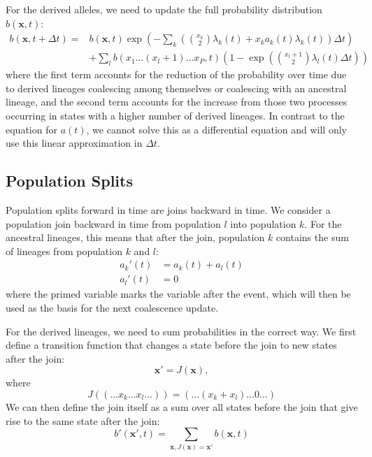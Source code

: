 \documentclass[a4paper]{article}
\begin{document}
For the derived alleles, we need to update the full probability distribution $b(\mathbf{x},t)$:
\begin{equation}
\begin{split}
     b(\mathbf{x}, t+\Delta t) = & b(\mathbf{x}, t) \exp\left( -\sum_k \left(\binom{x_k}{2}\lambda_k(t) +
                         x_k a_k(t) \lambda_k(t)   \right)\Delta t \right)\\
     & + \sum_l b(x_1\ldots (x_l+1)\ldots x_P, t) \left(1-\exp\left(
                     \binom{x_l + 1}{2}\lambda_l(t)\Delta t\right)  \right)
\end{split}
\end{equation}
where the first term accounts for the reduction of the probability over time due to derived lineages coalescing among themselves or coalescing with an ancestral lineage, and the second term accounts for the increase from those two processes occurring in states with a higher number of derived lineages. In contrast to the equation for $a(t)$, we cannot solve this as a differential equation and will only use this linear approximation in $\Delta t$.

\subsection*{Population Splits}
Population splits forward in time are joins backward in time. We consider a population join backward in time from population $l$ into population $k$. For the ancestral lineages, this means that after the join, population $k$ contains the sum of lineages from population $k$ and $l$:
\begin{align}
    a_k'(t) &= a_k(t) + a_l(t)\\
    a_l'(t) &= 0
\end{align}
where the primed variable marks the variable after the event, which will then be used as the basis for the next coalescence update.

For the derived lineages, we need to sum probabilities in the correct way. We first define a transition function that changes a state before the join to new states after the join:
\begin{equation}
    \mathbf{x}' = J(\mathbf{x}),
\end{equation} 
where
\begin{equation}
    J((\ldots x_k \ldots x_l \dots)) = (\ldots (x_k + x_l) \ldots 0 \ldots)
\end{equation}
We can then define the join itself as a sum over all states before the join that give rise to the same state after the join:
\begin{equation}
    b'(\mathbf{x}',t) = \sum_{\mathbf{x},J(\mathbf{x})=\mathbf{x}'} b(\mathbf{x},t)
\end{equation}
 
\end{document}
